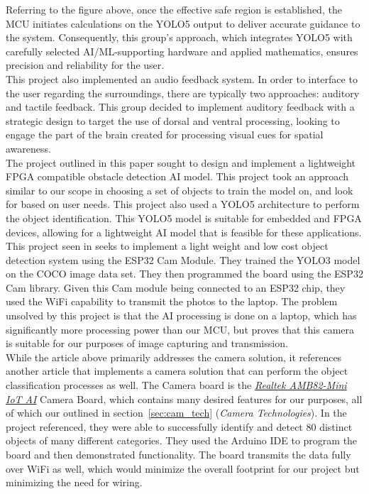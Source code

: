\noindent Referring to the figure above, once the effective safe region is established, the MCU initiates calculations on the YOLO5 output to deliver accurate guidance to the system. Consequently, this group's approach, which integrates YOLO5 with carefully selected AI/ML-supporting hardware and applied mathematics, ensures precision and reliability for the user. \\

\noindent This project also implemented an audio feedback system. In order to interface to the user regarding the surroundings, there are typically two approaches: auditory and tactile feedback. This group decided to implement auditory feedback with a strategic design to target the use of dorsal and ventral processing, looking to engage the part of the brain created for processing visual cues for spatial awareness.\\

\noindent The project outlined in this paper \cite{CVRef2} sought to design and implement a lightweight FPGA compatible obstacle detection AI model. This project took an approach similar to our scope in choosing a set of objects to train the model on, and look for based on user needs. This project also used a YOLO5 architecture to perform the object identification. This YOLO5 model is suitable for embedded and FPGA devices, allowing for a lightweight AI model that is feasible for these applications. \\

\noindent This project seen in \cite{ESP32CamRef1} seeks to implement a light weight and low cost object detection system using the ESP32 Cam Module. They trained the YOLO3 model on the COCO image data set. They then programmed the board using the ESP32 Cam library. Given this Cam module being connected to an ESP32 chip, they used the WiFi capability to transmit the photos to the laptop. The problem unsolved by this project is that the AI processing is done on a laptop, which has significantly more processing power than our MCU, but proves that this camera is suitable for our purposes of image capturing and transmission. \\

\noindent While the article above primarily addresses the camera solution, it references another article \cite{RealTekCamRef1} that implements a camera solution that can perform the object classification processes as well. The Camera board is the \underline{\textit{Realtek AMB82-Mini IoT AI}} Camera Board, which contains many desired features for our purposes, all of which our outlined in section~\ref{sec:cam_tech} (\textit{Camera Technologies}). In the project referenced, they were able to successfully identify and detect 80 distinct objects of many different categories. They used the Arduino IDE to program the board and then demonstrated functionality. The board transmits the data fully over WiFi as well, which would minimize the overall footprint for our project but minimizing the need for wiring.

